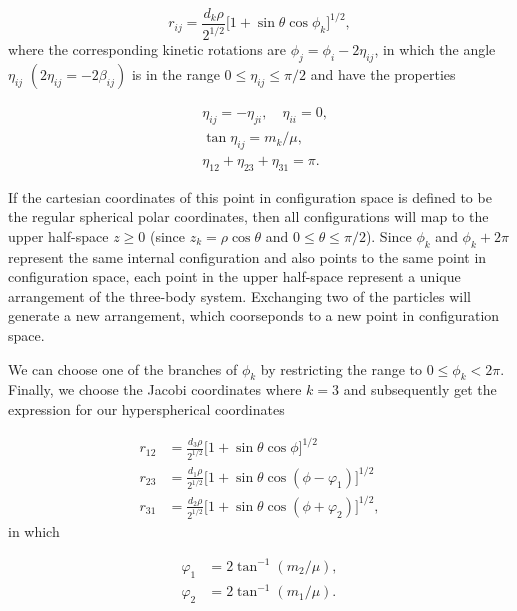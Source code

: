 \begin{equation}
r_{ij} = \frac{d_k\rho}{2^{1/2}}\big[1 + \sin\theta\cos\phi_k\big]^{1/2},
\end{equation}
where the corresponding kinetic rotations are $\phi_j=\phi_i-2\eta_{ij}$, in which the angle $\eta_{ij}$ $(2\eta_{ij} = -2\beta_{ij})$ is in the range $0 \leq \eta_{ij} \leq \pi/2$ and have the properties

\begin{subequations}
\begin{align}
&\eta_{ij} = -\eta_{ji}, \quad \eta_{ii} = 0,\\
&\tan\eta_{ij} = m_k/\mu,\\
&\eta_{12}+\eta_{23}+\eta_{31} = \pi.
\end{align} 
\end{subequations}

If the cartesian coordinates of this point in configuration space is defined to be the regular spherical polar coordinates, then all configurations will map to the upper half-space $z \geq 0$ (since $z_k=\rho\cos\theta$ and $0\leq \theta \leq \pi/2$). Since $\phi_k$ and $\phi_k + 2\pi$ represent the same internal configuration and also points to the same point in configuration space, each point in the upper half-space represent a unique arrangement of the three-body system. Exchanging two of the particles will generate a new arrangement, which coorseponds to a new point in configuration space. 

We can choose one of the branches of $\phi_k$ by restricting the range to $0 \leq \phi_k < 2\pi$. Finally, we choose the Jacobi coordinates where $k=3$ and subsequently get the expression for our hyperspherical coordinates

\begin{equation}
\begin{aligned}
r_{12} &= \frac{d_3\rho}{2^{1/2}}\big[1+\sin\theta\cos\phi\big]^{1/2}\\
r_{23} &= \frac{d_1\rho}{2^{1/2}}\big[1 + \sin\theta\cos(\phi-\varphi_1)\big]^{1/2}\\
r_{31} &= \frac{d_2\rho}{2^{1/2}}\big[1 + \sin\theta\cos(\phi + \varphi_2)\big]^{1/2},
\end{aligned}
\end{equation}
in which

\begin{equation}
\begin{aligned}
\varphi_1 &= 2\tan^{-1}(m_2/\mu),\\
\varphi_2 &= 2\tan^{-1}(m_1/\mu).
\end{aligned}
\end{equation}

